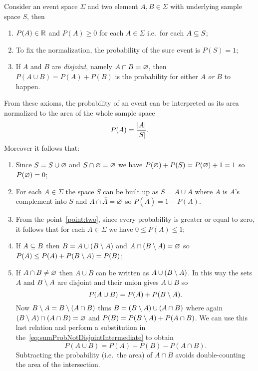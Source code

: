 Consider an event space $\Sigma$ and two element $A,B\in\Sigma$ with underlying sample space $S$, then
\begin{enumerate}
	\item
		$P(A) \in \mathbb{R}$ and $P(A) \ge 0$ for each $A\in\Sigma$ i.e.~for each $A\subseteq S$;
	\item
		To fix the normalization, the probability of the sure event is $P(S) = 1$;
	\item
		If $A$ and $B$ are \emph{disjoint}, namely $A\cap B = \varnothing$, then $P(A\cup B) = P(A) + P(B)$ is the probability for either $A$ \emph{or} $B$ to happen.
\end{enumerate}
From these axioms, the probability of an event can be interpreted as its area normalized to the area of the whole sample space
\begin{equation}\label{eq:interpretationProbabilityArea}
	P(A) = \frac{\lvert A\rvert}{\lvert S\rvert}.
\end{equation}
Moreover it follows that:
\begin{enumerate}
	\item
		Since $S = S\cup\varnothing$ and $S\cap\varnothing = \varnothing$ we have $P(\varnothing) + P(S) = P(\varnothing)  +1 = 1$ so $P(\varnothing) = 0$; 
	\item\label{point:two}
		For each $A\in\Sigma$ the space $S$ can be built up as $S = A \cup \bar{A}$ where $\bar{A}$ is $A$'s complement into $S$ and $ A \cap \bar{A} = \varnothing$ so $P(\bar{A}) = 1 - P(A)$.
	\item
		From the point~\ref{point:two}, since every probability is greater or equal to zero, it follows that for each $A\in\Sigma$ we have $0\le P(A) \le 1$;
	\item
		If $A \subseteq B$ then $B = A\cup (B\setminus A)$ and $A\cap (B\setminus A)=\varnothing$ so $P(A)\le P(A) + P(B\setminus A) = P(B)$;
	\item
		If $A\cap B \neq \varnothing$ then $A\cup B$ can be written as $A \cup(B\setminus A)$.
		In this way the sets $A$ and $B\setminus A$ are disjoint and their union gives $A\cup B$ so
		\begin{equation}\label{eq:sumProbNotDisjointIntermediate}
			P(A\cup B) = P(A) + P(B\setminus A).
		\end{equation}
		Now $B\setminus A = B \setminus(A\cap B)$ thus $B = (B\setminus A) \cup (A\cap B)$ where again $(B\setminus A) \cap (A\cap B) = \varnothing$ and 
		$P(B) = P(B\setminus A) + P(A\cap B)$.
		We can use this last relation and perform a substitution in the~\eqref{eq:sumProbNotDisjointIntermediate} to obtain
		\begin{equation}
			P(A\cup B) = P(A) + P(B) - P(A\cap B).
		\end{equation}
		Subtracting the probability (i.e.~the area) of $A\cap B$ avoids double-counting the area of the intersection.
\end{enumerate}


